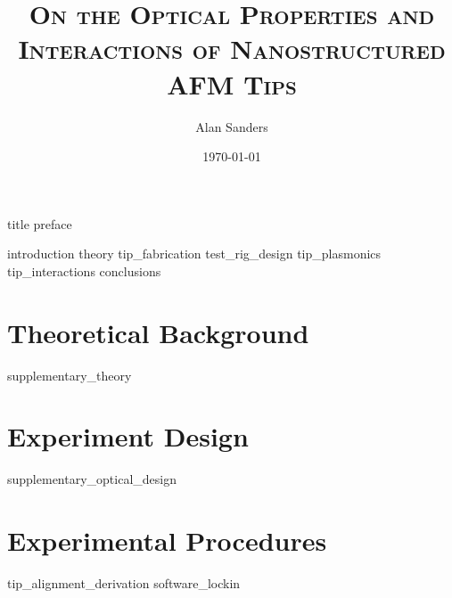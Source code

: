 \documentclass[12pt, a4paper, twoside, draft=false]{book}
\begin{document}
\title{\textsc{On the Optical Properties and Interactions of Nanostructured AFM Tips}}
\author{Alan Sanders}
\date{\today}

\frontmatter
\begin{singlespace*}
{title}
{preface}
\tableofcontents
\listoffigures
\end{singlespace*}

\mainmatter
{introduction}
{theory}
{tip_fabrication}
{test_rig_design}
{tip_plasmonics}
{tip_interactions}
{conclusions}

\begin{singlespace*}
\printbibliography[heading=bibintoc, notcategory=fullcited, resetnumbers=true]
\glsaddall
\printglossary[type=symbols, style=superborder]
\printglossary[type=\acronymtype, style=superheader]
\end{singlespace*}

\appendix
\cleardoublepage
{}
\chapter{Theoretical Background}
{supplementary_theory}
\chapter{Experiment Design}
{supplementary_optical_design}
\chapter{Experimental Procedures}
{tip_alignment_derivation}
{software_lockin}
\end{document}

